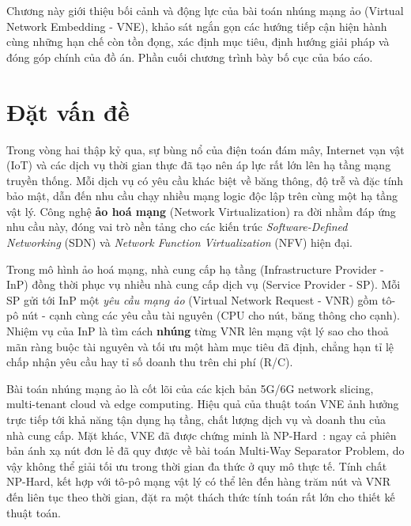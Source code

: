 \documentclass[../DoAn.tex]{subfiles}
\begin{document}
\label{ch:gioi_thieu}

Chương này giới thiệu bối cảnh và động lực của bài toán nhúng mạng ảo (Virtual Network Embedding - VNE), khảo sát ngắn gọn các hướng tiếp cận hiện hành cùng những hạn chế còn tồn đọng, xác định mục tiêu, định hướng giải pháp và đóng góp chính của đồ án. Phần cuối chương trình bày bố cục của báo cáo.

\section{Đặt vấn đề}
\label{sec:dvd}

Trong vòng hai thập kỷ qua, sự bùng nổ của điện toán đám mây, Internet vạn vật (IoT) và các dịch vụ thời gian thực đã tạo nên áp lực rất lớn lên hạ tầng mạng truyền thống. Mỗi dịch vụ có yêu cầu khác biệt về băng thông, độ trễ và đặc tính bảo mật, dẫn đến nhu cầu chạy nhiều mạng logic độc lập trên cùng một hạ tầng vật lý. Công nghệ \textbf{ảo hoá mạng} (Network Virtualization) ra đời nhằm đáp ứng nhu cầu này, đóng vai trò nền tảng cho các kiến trúc \textit{Software-Defined Networking} (SDN) và \textit{Network Function Virtualization} (NFV) hiện đại\cite{kreutz2015sdn_survey,mijumbi2016nfv_survey}.

Trong mô hình ảo hoá mạng, nhà cung cấp hạ tầng (Infrastructure Provider - InP) đồng thời phục vụ nhiều nhà cung cấp dịch vụ (Service Provider - SP). Mỗi SP gửi tới InP một \textit{yêu cầu mạng ảo} (Virtual Network Request - VNR) gồm tô-pô nút - cạnh cùng các yêu cầu tài nguyên (CPU cho nút, băng thông cho cạnh). Nhiệm vụ của InP là tìm cách \textbf{nhúng} từng VNR lên mạng vật lý sao cho thoả mãn ràng buộc tài nguyên và tối ưu một hàm mục tiêu đã định, chẳng hạn tỉ lệ chấp nhận yêu cầu hay tỉ số doanh thu trên chi phí (R/C)\cite{fischer2013vne_survey,cao2019vne_survey}.

Bài toán nhúng mạng ảo là cốt lõi của các kịch bản 5G/6G network slicing, multi-tenant cloud và edge computing. Hiệu quả của thuật toán VNE ảnh hưởng trực tiếp tới khả năng tận dụng hạ tầng, chất lượng dịch vụ và doanh thu của nhà cung cấp. Mặt khác, VNE đã được chứng minh là NP-Hard~\cite{chowdhury2009vine}: ngay cả phiên bản ánh xạ nút đơn lẻ đã quy được về bài toán Multi-Way Separator Problem, do vậy không thể giải tối ưu trong thời gian đa thức ở quy mô thực tế. Tính chất NP-Hard, kết hợp với tô-pô mạng vật lý có thể lên đến hàng trăm nút và VNR đến liên tục theo thời gian, đặt ra một thách thức tính toán rất lớn cho thiết kế thuật toán.
\end{document}
